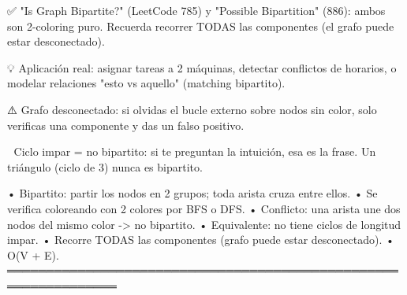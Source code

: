 \begin{dsaentrevistas}

✅ "Is Graph Bipartite?" (LeetCode 785) y "Possible Bipartition" (886):
   ambos son 2-coloring puro. Recuerda recorrer TODAS las componentes
   (el grafo puede estar desconectado).

💡 Aplicación real: asignar tareas a 2 máquinas, detectar conflictos de
   horarios, o modelar relaciones "esto vs aquello" (matching bipartito).

⚠️ Grafo desconectado: si olvidas el bucle externo sobre nodos sin
   color, solo verificas una componente y das un falso positivo.

🔑 Ciclo impar = no bipartito: si te preguntan la intuición, esa es la
   frase. Un triángulo (ciclo de 3) nunca es bipartito.

\end{dsaentrevistas}

\begin{dsaresumen}

• Bipartito: partir los nodos en 2 grupos; toda arista cruza entre ellos.
• Se verifica coloreando con 2 colores por BFS o DFS.
• Conflicto: una arista une dos nodos del mismo color -> no bipartito.
• Equivalente: no tiene ciclos de longitud impar.
• Recorre TODAS las componentes (grafo puede estar desconectado).
• O(V + E).
════════════════════════════════════════════════════════════════

\end{dsaresumen}
